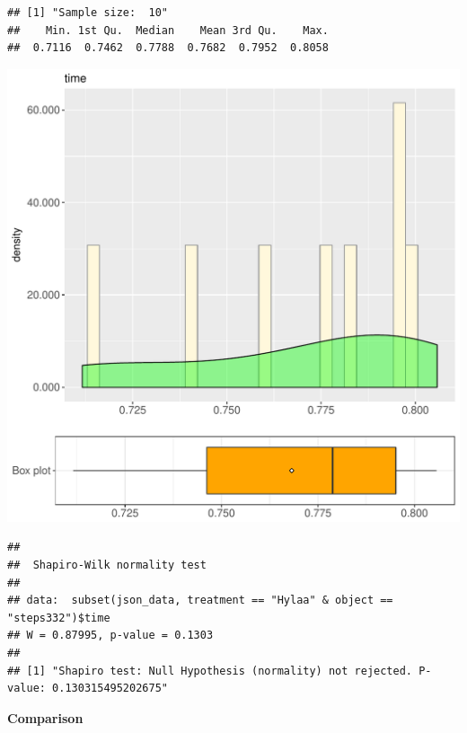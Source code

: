 \documentclass{article}\usepackage[]{graphicx}\usepackage[]{color}
\makeatletter
\def\maxwidth{ %
  \ifdim\Gin@nat@width>\linewidth
    \linewidth
  \else
    \Gin@nat@width
  \fi
}
\newenvironment{kframe}{%
 \def\at@end@of@kframe{}%
 \ifinner\ifhmode%
  \def\at@end@of@kframe{\end{minipage}}%
  \begin{minipage}{\columnwidth}%
 \fi\fi%
 \def\FrameCommand##1{\hskip\@totalleftmargin \hskip-\fboxsep
 \colorbox{shadecolor}{##1}\hskip-\fboxsep
     \hskip-\linewidth \hskip-\@totalleftmargin \hskip\columnwidth}%
 \MakeFramed {\advance\hsize-\width
   \@totalleftmargin\z@ \linewidth\hsize
   \@setminipage}}%
 {\par\unskip\endMakeFramed%
 \at@end@of@kframe}
\newenvironment{knitrout}{}{} %
\makeatother
\begin{document}
\begin{knitrout}
\color{fgcolor}\begin{kframe}
\begin{verbatim}
## [1] "Sample size:  10"
##    Min. 1st Qu.  Median    Mean 3rd Qu.    Max. 
##  0.7116  0.7462  0.7788  0.7682  0.7952  0.8058
\end{verbatim}
\end{kframe}
\includegraphics[width=\maxwidth]{figure/RH3_Hylaa_steps332-1} 
\begin{kframe}\begin{verbatim}
## 
## 	Shapiro-Wilk normality test
## 
## data:  subset(json_data, treatment == "Hylaa" & object == "steps332")$time
## W = 0.87995, p-value = 0.1303
## 
## [1] "Shapiro test: Null Hypothesis (normality) not rejected. P-value: 0.130315495202675"
\end{verbatim}
\end{kframe}
\end{knitrout}
  
 \textbf{Comparison}
  
\end{document}
